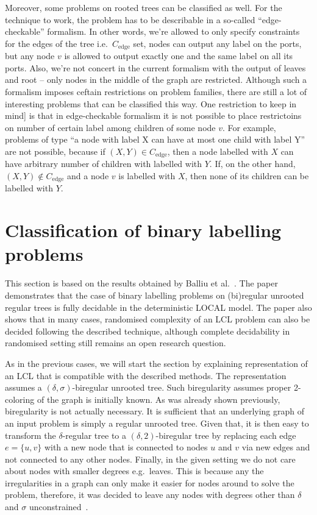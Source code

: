 Moreover, some problems on rooted trees can be classified as well. For the technique to work, the problem
has to be describable in a so-called ``edge-checkable'' formalism. In other words, we're allowed to
only specify constraints for the edges of the tree i.e.\ $C_{\textrm{edge}}$ set, nodes can output any label
on the ports, but any node $v$ is allowed to output exactly one and the same label on all its ports.
Also, we're not concert in the current formalism with the output of leaves and root -- only nodes in the
middle of the graph are restricted. Although such a formalism imposes ceftain restrictions on problem families,
there are still a lot of interesting problems that can be classified this way. One restriction to keep in mind]
is that in edge-checkable formalism it is not possible to place restrictoins on number of certain label
among children of some node $v$. For example, problems of type ``a node with label X can have at most one child with label Y''
are not possible, because if $(X, Y) \in C_{\textrm{edge}}$, then a node labelled with $X$ can have arbitrary number of children
with labelled with $Y$. If, on the other hand, $(X, Y) \notin C_{\textrm{edge}}$ and a node $v$ is labelled with $X$, then
none of its children can be labelled with $Y$.

\section{Classification of binary labelling problems}

This section is based on the results obtained by Balliu et al.~\cite{Balliu2019c}. The paper demonstrates
that the case of binary labelling problems on (bi)regular unrooted regular trees is fully decidable in
the deterministic LOCAL model. The paper also shows that in many cases, randomised complexity of an LCL problem
can also be decided following the described technique, although complete decidability in randomised setting
still remains an open research question.

As in the previous cases, we will start the section by explaining representation of an LCL that is compatible
with the described methods. The representation assumes a $(\delta, \sigma)$-biregular unrooted tree.
Such biregularity assumes proper 2-coloring of the graph is initially known.
As was already shown previously, biregularity is not actually necessary. It is
sufficient that an underlying graph of an input problem is simply a regular
unrooted tree. Given that, it is then easy to transform the $\delta$-regular tree
to a $(\delta, 2)$-biregular tree by replacing each edge $e = \{u, v\}$ with a new node that is
connected to nodes $u$ and $v$ via new edges and not connected to any other nodes. Finally,
in the given setting we do not care about nodes with smaller degrees e.g.\ leaves. This is
because any the irregularities in a graph can only make it easier for nodes around to solve
the problem, therefore, it was decided to leave any nodes with degrees other than $\delta$
and $\sigma$ unconstrained~\cite{Balliu2019c}.

